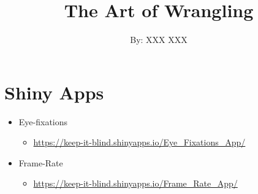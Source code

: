 \documentclass{article}
\title{The Art of Wrangling}
\author{By: XXX XXX}
\date{}
\begin{document}
\maketitle
\startcontents[mainsections]


\section{Shiny Apps}
\begin{itemize}
  \item Eye-fixations
  \begin{itemize}
    \item \url{https://keep-it-blind.shinyapps.io/Eye_Fixations_App/}
  \end{itemize}
  \item Frame-Rate
  \begin{itemize}
    \item \url{https://keep-it-blind.shinyapps.io/Frame_Rate_App/}
  \end{itemize}
\end{itemize}

\hfill\hfill\hfill
\hfill\hfill\hfill
\end{document}

